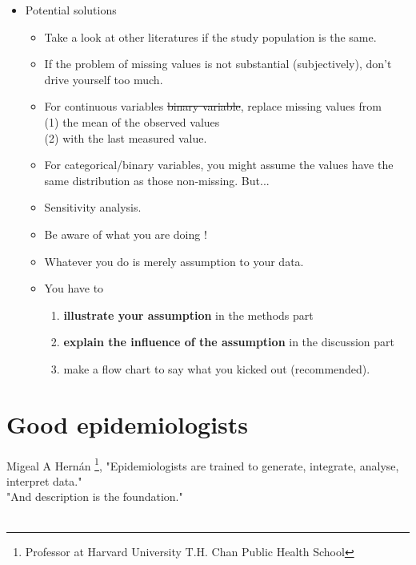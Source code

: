 \begin{frame}{\secname}
\begin{itemize}
\item Potential solutions
\begin{itemize}
	\item<1|handout:1->  Take a look at other literatures if the study population is the same.
	\item<2|handout:2->  If the problem of missing values is not substantial (subjectively), don't drive yourself too much.
	\item<3|handout:3->  For continuous variables \st{binary variable}, replace missing values from \\ (1) the mean of the observed values \\(2) with the last measured value. \cite{Sterne2009}
	\item<3|handout:3->  For categorical/binary variables, you might assume the values have the same distribution as those non-missing. But...
	\item<3|handout:3->  Sensitivity analysis. \cite{Sterne2009}
\item<4|handout:4->  Be aware of what you are doing ! 
\item<4|handout:4->  Whatever you do is merely assumption to your data. 
	\item<4|handout:4->  You have to \begin{enumerate}
 \item  \textbf{illustrate your assumption} in the methods part
 \item \textbf{explain the influence of the assumption} in the discussion part
 \item 	make a flow chart to say what you kicked out (recommended).
 \end{enumerate}
\end{itemize}
\end{itemize}
\end{frame}

\section{Good epidemiologists}
\begin{frame}{\secname}
\begin{tcolorbox}
Migeal A Hernán \footnote{Professor at Harvard University T.H. Chan Public Health School}, "Epidemiologists are trained to generate, integrate, analyse, interpret data." \\

"And description is the foundation." \\\\
\end{tcolorbox}



	
\end{frame}

